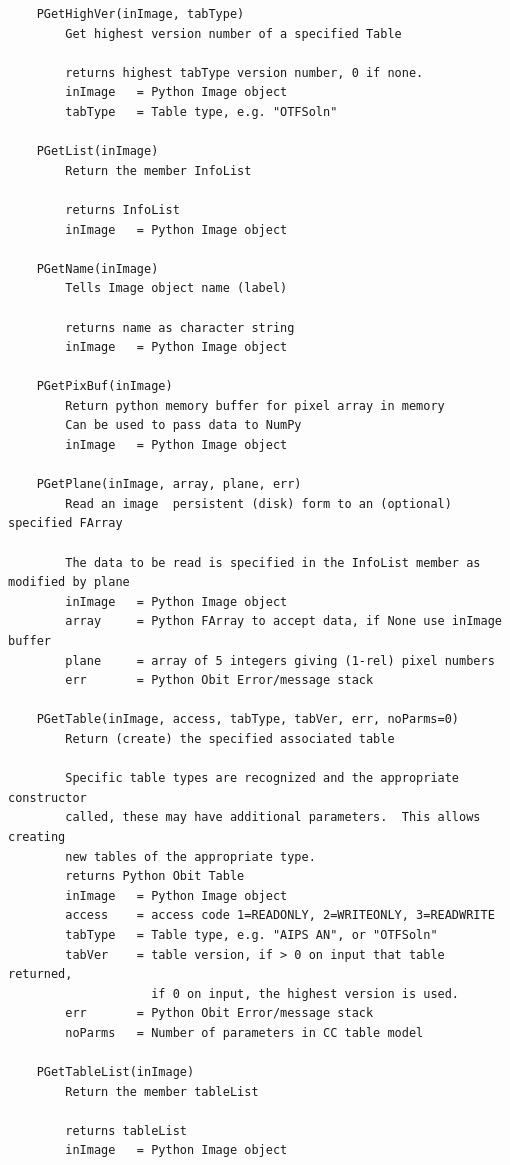 \documentclass[11pt]{report}
\begin{document}
\begin{verbatim}
    PGetHighVer(inImage, tabType)
        Get highest version number of a specified Table
        
        returns highest tabType version number, 0 if none.
        inImage   = Python Image object
        tabType   = Table type, e.g. "OTFSoln"
    
    PGetList(inImage)
        Return the member InfoList
        
        returns InfoList
        inImage   = Python Image object
    
    PGetName(inImage)
        Tells Image object name (label)
        
        returns name as character string
        inImage   = Python Image object
    
    PGetPixBuf(inImage)
        Return python memory buffer for pixel array in memory
        Can be used to pass data to NumPy
        inImage   = Python Image object
    
    PGetPlane(inImage, array, plane, err)
        Read an image  persistent (disk) form to an (optional) specified FArray
        
        The data to be read is specified in the InfoList member as modified by plane
        inImage   = Python Image object
        array     = Python FArray to accept data, if None use inImage buffer
        plane     = array of 5 integers giving (1-rel) pixel numbers
        err       = Python Obit Error/message stack
    
    PGetTable(inImage, access, tabType, tabVer, err, noParms=0)
        Return (create) the specified associated table
        
        Specific table types are recognized and the appropriate constructor
        called, these may have additional parameters.  This allows creating
        new tables of the appropriate type.
        returns Python Obit Table
        inImage   = Python Image object
        access    = access code 1=READONLY, 2=WRITEONLY, 3=READWRITE
        tabType   = Table type, e.g. "AIPS AN", or "OTFSoln"
        tabVer    = table version, if > 0 on input that table returned,
                    if 0 on input, the highest version is used.
        err       = Python Obit Error/message stack
        noParms   = Number of parameters in CC table model
    
    PGetTableList(inImage)
        Return the member tableList
        
        returns tableList
        inImage   = Python Image object
    

\end{verbatim}
\end{document}
